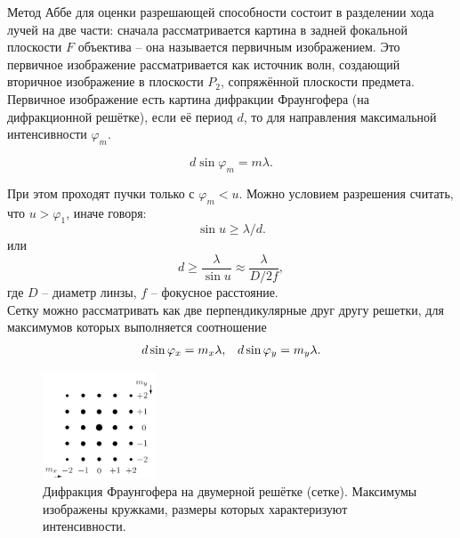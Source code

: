 \documentclass[a4paper,12pt]{article}
\begin{document}
Метод Аббе для оценки разрешающей способности состоит в разделении хода лучей на две части: сначала рассматривается картина в задней фокальной плоскости $F$ объектива -- она называется первичным изображением. Это первичное изображение рассматривается как источник волн, создающий вторичное изображение в плоскости $P_2$, сопряжённой плоскости предмета.\\
Первичное изображение есть картина дифракции Фраунгофера (на дифракционной решётке), если её период $d$, то для направления максимальной интенсивности $\varphi_m$.

\begin{equation}
d \sin \varphi_m = m\lambda.
\end{equation}

При этом проходят пучки только с $\varphi_m < u$. Можно условием разрешения считать, что $u > \varphi_1$, иначе говоря:
$$
\sin u \geq \lambda/d.
$$
или
\begin{equation}
\label{equ:allow}
d \geq \dfrac{\lambda}{\sin u} \approx \dfrac{\lambda}{D/2f},
\end{equation}
где $D$ -- диаметр линзы, $f$ -- фокусное расстояние.\\
Сетку можно рассматривать как две перпендикулярные друг другу решетки, для максимумов которых выполняется соотношение
\begin{equation}
\begin{array}{c c}
d\sin \varphi_x = m_x \lambda, & d\sin \varphi_y = m_y \lambda. \\
\end{array}
\end{equation}


\begin{figure}[h!]
    \centering
    \includegraphics[width = 0.3\textwidth]{3.png}
    \caption{Дифракция Фраунгофера на двумерной решётке (сетке). Максимумы изображены кружками, размеры которых характеризуют интенсивности.}
    \label{fig:no_int}
\end{figure}\\


\newpage
\end{document}
